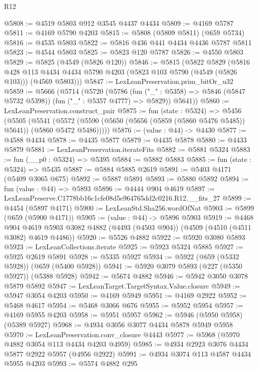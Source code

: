 \begin{lexlean}{R12}
\begin{coremodule}
@5808 := @4519 @5803 @912 @3545 @4437 @4434
@5809 := @4169 @5787
@5811 := @4169 @5790 @4203
@5815 := @5808 (@5809 @5811) (@659 @5734)
@5816 := @4535 @5803
@5822 := @5816 @436 @441 @4434 @4436 @5787 @5811
@5823 := @4544 @5803
@5825 := @5823 @120 @5787
@5826 := @4550 @5803
@5829 := @5825 (@4549 (@5826 @120))
@5846 := @5815
    (@5822
      @5829
      (@5816
        @428
        @113
        @4434
        @4434
        @5790
        @4203
        (@5823 @103 @5790 (@4549 (@5826 @103)))
        (@4569 @5803)))
@5847 := LexLeanPreservation.prim_bitOr_u32
@5859 := @5666
    (@5714
      (@5720
        (@5786 (fun ("_" : @5358) => @5846 (@5847 @5732 @5398)) (fun ("_" : @5357 @4777) => @5829))
        @5641))
@5860 := LexLeanPreservation.construct_pair
@5875 := fun (state : @5324) =>
  @5456
    (@5505
      (@5541 (@5572 (@5590 (@5650 (@5656 (@5859 (@5860 @5476 @5485)) @5641)) (@5860 @5472 @5486)))))
@5876 := (value : @44) -> @4430
@5877 := @4588 @4434
@5878 := @4435 @5877
@5879 := @4435 @5878
@5880 := @4433 @5879
@5881 := LexLeanPreservation.iterateFits
@5882 := @5881 @5324
@5883 := fun (__p0 : @5324) => @5395
@5884 := @5882 @5883
@5885 := fun (state : @5324) => @5435
@5887 := @5884 @5885 @2619
@5891 := @5403 @4171 (@5409 @3065 @675)
@5892 := @5887 @5891
@5893 := @5880 @5892
@5894 := fun (value : @44) => @5893
@5896 := @4444 @904 @4619
@5897 := LexLeanPreserve.C1778bb16c1cfe08d5e964765dd2c0216.R12.__fits_27
@5899 := @4454 (@5897 @4171)
@5900 := LexLeanStd.Sha256.wordOfNat
@5903 := @5899 (@659 (@5900 @4171))
@5905 := (value : @44) -> @5896 @5903
@5919 := @4468
    @904
    @4619
    @5903
    @3082
    @4882
    (@4493 (@4503 @904))
    (@4509 (@4510 (@4511 @3082) @4619 @4486))
@5920 := @5526 @4882
@5922 := @5920 @3080 @5893
@5923 := LexLeanCollections.iterate
@5925 := @5923 @5324 @5885
@5927 := @5925 @2619 @5891
@5928 := @5335 @5927
@5934 := @5922 (@659 (@5332 @5928)) (@659 (@5400 @5928))
@5941 := @5920 @3079 @5893 (@227 (@5350 @5927)) (@5388 @5928)
@5942 := @5674 @4882
@5946 := @5942 @3050 @3078 @5879 @5892
@5947 := LexLeanTarget.TargetSyntax.Value.closure
@5949 := @5947 @3054 @4203
@5950 := @4169 @5949
@5951 := @4169 @2922
@5952 := @5468 @4617
@5954 := @5468 @3066 @676
@5955 := @5952 @5954
@5957 := @4169 @5955 @4203
@5958 := @5951 @5957
@5962 := @5946 (@5950 @5958) (@5389 @5927)
@5968 := @4934 @3056 @3077 @4434 @5878 @5949 @5958
@5970 := LexLeanPreservation.conv_closure @4443
@5977 := @5968 (@5970 @4882 @3054 @113 @4434 @4203 @4959)
@5985 := @4934 @2923 @3076 @4434 @5877 @2922 @5957 (@4956 @2922)
@5991 := @4934 @3074 @113 @4587 @4434 @5955 @4203
@5993 := @5574 @4882 @295

\end{coremodule}
\end{lexlean}
